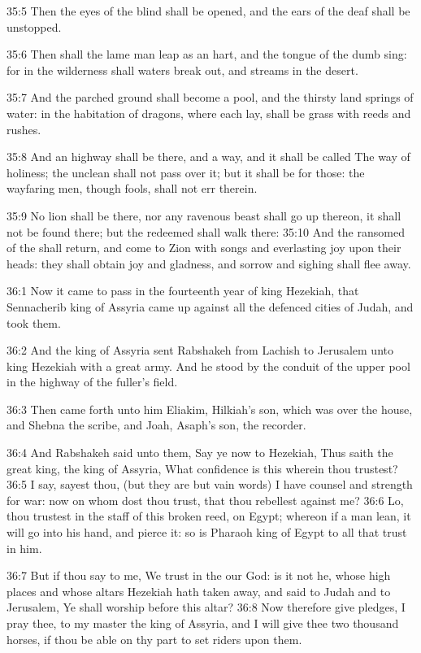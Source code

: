 35:5 Then the eyes of the blind shall be opened, and the ears of the deaf shall be unstopped.

35:6 Then shall the lame man leap as an hart, and the tongue of the dumb sing: for in the wilderness shall waters break out, and streams in the desert.

35:7 And the parched ground shall become a pool, and the thirsty land springs of water: in the habitation of dragons, where each lay, shall be grass with reeds and rushes.

35:8 And an highway shall be there, and a way, and it shall be called The way of holiness; the unclean shall not pass over it; but it shall be for those: the wayfaring men, though fools, shall not err therein.

35:9 No lion shall be there, nor any ravenous beast shall go up thereon, it shall not be found there; but the redeemed shall walk there: 35:10 And the ransomed of the \LORD shall return, and come to Zion with songs and everlasting joy upon their heads: they shall obtain joy and gladness, and sorrow and sighing shall flee away.

36:1 Now it came to pass in the fourteenth year of king Hezekiah, that Sennacherib king of Assyria came up against all the defenced cities of Judah, and took them.

36:2 And the king of Assyria sent Rabshakeh from Lachish to Jerusalem unto king Hezekiah with a great army. And he stood by the conduit of the upper pool in the highway of the fuller's field.

36:3 Then came forth unto him Eliakim, Hilkiah's son, which was over the house, and Shebna the scribe, and Joah, Asaph's son, the recorder.

36:4 And Rabshakeh said unto them, Say ye now to Hezekiah, Thus saith the great king, the king of Assyria, What confidence is this wherein thou trustest?  36:5 I say, sayest thou, (but they are but vain words) I have counsel and strength for war: now on whom dost thou trust, that thou rebellest against me?  36:6 Lo, thou trustest in the staff of this broken reed, on Egypt; whereon if a man lean, it will go into his hand, and pierce it: so is Pharaoh king of Egypt to all that trust in him.

36:7 But if thou say to me, We trust in the \LORD our God: is it not he, whose high places and whose altars Hezekiah hath taken away, and said to Judah and to Jerusalem, Ye shall worship before this altar?  36:8 Now therefore give pledges, I pray thee, to my master the king of Assyria, and I will give thee two thousand horses, if thou be able on thy part to set riders upon them.

